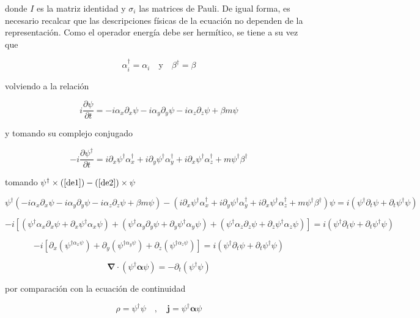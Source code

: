 donde $I$ es la matriz identidad y $\sigma_i$ las matrices de Pauli. De igual forma, es necesario recalcar que las descripciones físicas de la ecuación no dependen de la representación. Como el operador energía debe ser hermítico, se tiene a su vez que 

$$ \alpha_i^{\dagger} = \alpha_i \quad \text{y} \quad \beta^{\dagger} = \beta $$

volviendo a la relación 

\begin{equation}
    i\frac{\partial \psi}{\partial t} =  -i\alpha_x\partial_x\psi -i\alpha_y\partial_y\psi -i\alpha_z\partial_z\psi +\beta m \psi
    \label{de1}
\end{equation}

y tomando su complejo conjugado

\begin{equation}
    -i\frac{\partial \psi^{\dagger}}{\partial t} = i\partial_x\psi^{\dagger}\alpha_x^{\dagger} +i\partial_y\psi^{\dagger}\alpha_y^{\dagger} +i\partial_{x}\psi^{\dagger}\alpha_z^{\dagger} +m\psi^{\dagger}\beta^{\dagger}
    \label{de2}
\end{equation}

tomando $\psi^{\dagger}\times (\ref{de1})-(\ref{de2})\times \psi$

$$ \psi^{\dagger}(-i\alpha_x\partial_x\psi -i\alpha_y\partial_y\psi -i\alpha_z\partial_z\psi +\beta m \psi) - (i\partial_x\psi^{\dagger}\alpha_x^{\dagger} +i\partial_y\psi^{\dagger}\alpha_y^{\dagger} +i\partial_{x}\psi^{\dagger}\alpha_z^{\dagger} +m\psi^{\dagger}\beta^{\dagger})\psi = i(\psi^{\dagger}\partial_{t}\psi + \partial_t \psi^{\dagger}\psi) $$

$$ -i[(\psi^{\dagger}\alpha_x\partial_x\psi + \partial_x \psi^{\dagger}\alpha_x\psi) + (\psi^{\dagger}\alpha_y\partial_y\psi + \partial_y \psi^{\dagger}\alpha_y\psi) + (\psi^{\dagger}\alpha_z\partial_z\psi + \partial_z \psi^{\dagger}\alpha_z\psi)]=i(\psi^{\dagger}\partial_{t}\psi + \partial_t \psi^{\dagger}\psi) $$

$$ -i[\partial_x(\psi^{\dagger\alpha_x\psi}) + \partial_y(\psi^{\dagger\alpha_y\psi}) + \partial_z(\psi^{\dagger\alpha_z\psi})]=i(\psi^{\dagger}\partial_{t}\psi + \partial_t \psi^{\dagger}\psi) $$

$$ \boldsymbol\nabla \cdot (\psi^{\dagger}\boldsymbol\alpha\psi) = -\partial_t(\psi^{\dagger}\psi) $$

por comparación con la ecuación de continuidad

$$ \rho = \psi^{\dagger}\psi \quad ,\quad \textbf{j} = \psi^{\dagger}\boldsymbol\alpha\psi $$

